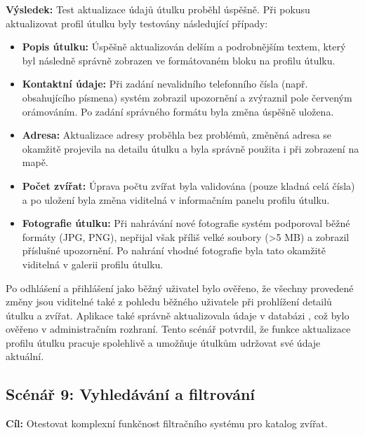 \documentclass[czech, bp, kiv, he, iso690numb, pdf]{fasthesis}
\begin{document}
    \noindent \textbf{Výsledek:}
    Test aktualizace údajů útulku proběhl úspěšně. Při pokusu aktualizovat profil útulku byly testovány následující případy:
    \begin{itemize}
        \item \textbf{Popis útulku:} Úspěšně aktualizován delším a podrobnějším textem, který byl následně správně zobrazen ve formátovaném bloku na profilu útulku.

        \item \textbf{Kontaktní údaje:} Při zadání nevalidního telefonního čísla (např. obsahujícího písmena) systém zobrazil upozornění  a zvýraznil pole červeným orámováním. Po zadání správného formátu byla změna úspěšně uložena.

        \item \textbf{Adresa:} Aktualizace adresy proběhla bez problémů, změněná adresa se okamžitě projevila na detailu útulku a byla správně použita i při zobrazení na mapě.

        \item \textbf{Počet zvířat:} Úprava počtu zvířat byla validována (pouze kladná celá čísla) a po uložení byla změna viditelná v informačním panelu profilu útulku.

        \item \textbf{Fotografie útulku:} Při nahrávání nové fotografie systém podporoval běžné formáty (JPG, PNG), nepřijal však příliš velké soubory (>5 MB) a zobrazil příslušné upozornění. Po nahrání vhodné fotografie byla tato okamžitě viditelná v galerii profilu útulku.
    \end{itemize}

    Po odhlášení a přihlášení jako běžný uživatel bylo ověřeno, že všechny provedené změny jsou viditelné také z pohledu běžného uživatele při prohlížení detailů útulku a zvířat. Aplikace také správně aktualizovala údaje v databázi , což bylo ověřeno v administračním rozhraní. Tento scénář potvrdil, že funkce aktualizace profilu útulku pracuje spolehlivě a umožňuje útulkům udržovat své údaje aktuální.



    \subsection*{Scénář 9: Vyhledávání a filtrování}

    \textbf{Cíl:} Otestovat komplexní funkčnost filtračního systému pro katalog zvířat.\\
\end{document}
